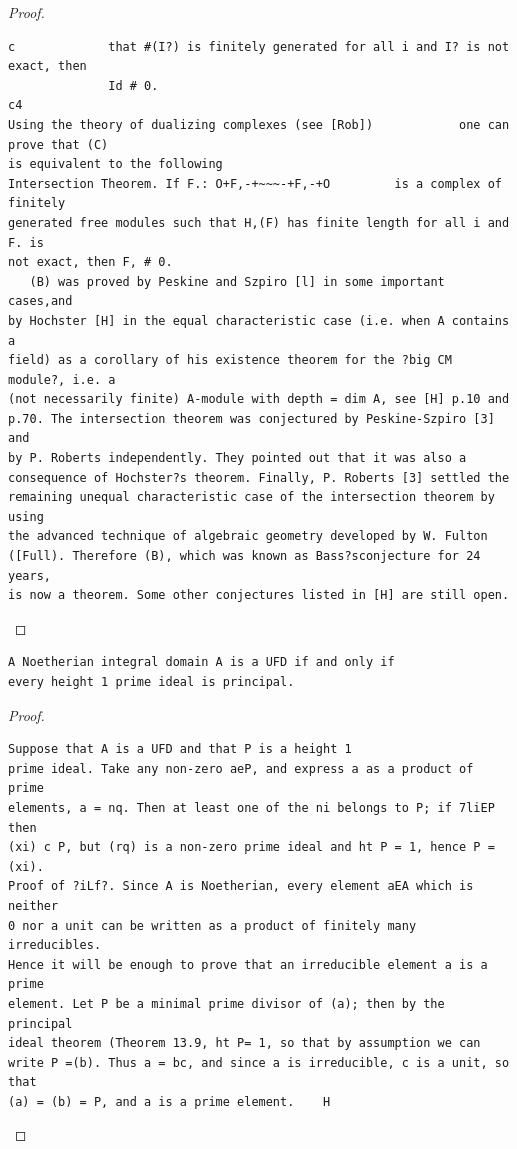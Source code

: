 \begin{proof}
\begin{verbatim}
c             that #(I?) is finitely generated for all i and I? is not exact, then
              Id # 0.
c4
Using the theory of dualizing complexes (see [Rob])            one can prove that (C)
is equivalent to the following
Intersection Theorem. If F.: O+F,-+~~~-+F,-+O         is a complex of finitely
generated free modules such that H,(F) has finite length for all i and F. is
not exact, then F, # 0.
   (B) was proved by Peskine and Szpiro [l] in some important cases,and
by Hochster [H] in the equal characteristic case (i.e. when A contains a
field) as a corollary of his existence theorem for the ?big CM module?, i.e. a
(not necessarily finite) A-module with depth = dim A, see [H] p.10 and
p.70. The intersection theorem was conjectured by Peskine-Szpiro [3] and
by P. Roberts independently. They pointed out that it was also a
consequence of Hochster?s theorem. Finally, P. Roberts [3] settled the
remaining unequal characteristic case of the intersection theorem by using
the advanced technique of algebraic geometry developed by W. Fulton
([Full). Therefore (B), which was known as Bass?sconjecture for 24 years,
is now a theorem. Some other conjectures listed in [H] are still open.
\end{verbatim}
\end{proof}


\begin{theorem}\label{mcrt-auto-theorem-20-1}\uses{}
\begin{verbatim}
A Noetherian integral domain A is a UFD if and only if
every height 1 prime ideal is principal.
\end{verbatim}
\end{theorem}
\begin{proof}
\begin{verbatim}
Suppose that A is a UFD and that P is a height 1
prime ideal. Take any non-zero aeP, and express a as a product of prime
elements, a = nq. Then at least one of the ni belongs to P; if 7liEP then
(xi) c P, but (rq) is a non-zero prime ideal and ht P = 1, hence P = (xi).
Proof of ?iLf?. Since A is Noetherian, every element aEA which is neither
0 nor a unit can be written as a product of finitely many irreducibles.
Hence it will be enough to prove that an irreducible element a is a prime
element. Let P be a minimal prime divisor of (a); then by the principal
ideal theorem (Theorem 13.9, ht P= 1, so that by assumption we can
write P =(b). Thus a = bc, and since a is irreducible, c is a unit, so that
(a) = (b) = P, and a is a prime element.    H
\end{verbatim}
\end{proof}


